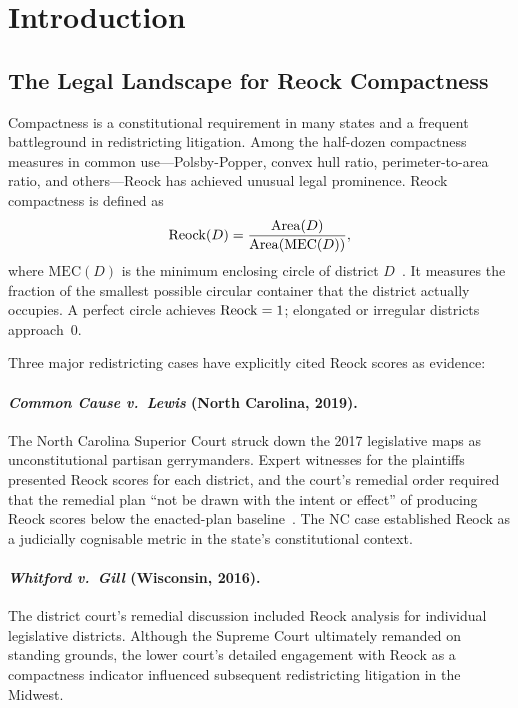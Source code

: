 \section{Introduction}
\label{sec:introduction}

\subsection{The Legal Landscape for Reock Compactness}

Compactness is a constitutional requirement in many states and a frequent
battleground in redistricting litigation.
Among the half-dozen compactness measures in common use---Polsby-Popper,
convex hull ratio, perimeter-to-area ratio, and others---Reock has achieved
unusual legal prominence.
Reock compactness is defined as
\[
  \mathrm{Reock}{}(D) = \frac{\mathrm{Area}(D)}{\mathrm{Area}(\mathrm{MEC}(D))},
\]
where $\mathrm{MEC}(D)$ is the minimum enclosing circle of district $D$~\citep{reock1961}.
It measures the fraction of the smallest possible circular container that the
district actually occupies.
A perfect circle achieves $\mathrm{Reock}{} = 1$; elongated or irregular districts
approach~0.

Three major redistricting cases have explicitly cited Reock scores as evidence:

\paragraph{\textit{Common Cause v.\ Lewis} (North Carolina, 2019).}
The North Carolina Superior Court struck down the 2017 legislative maps as
unconstitutional partisan gerrymanders.
Expert witnesses for the plaintiffs presented Reock scores for each district,
and the court's remedial order required that the remedial plan ``not be drawn
with the intent or effect'' of producing Reock scores below the enacted-plan
baseline~\citep{common_cause_lewis}.
The NC case established Reock as a judicially cognisable metric in the
state's constitutional context.

\paragraph{\textit{Whitford v.\ Gill} (Wisconsin, 2016).}
The district court's remedial discussion included Reock analysis for
individual legislative districts.
Although the Supreme Court ultimately remanded on standing grounds, the
lower court's detailed engagement with Reock as a compactness indicator
influenced subsequent redistricting litigation in the Midwest.

